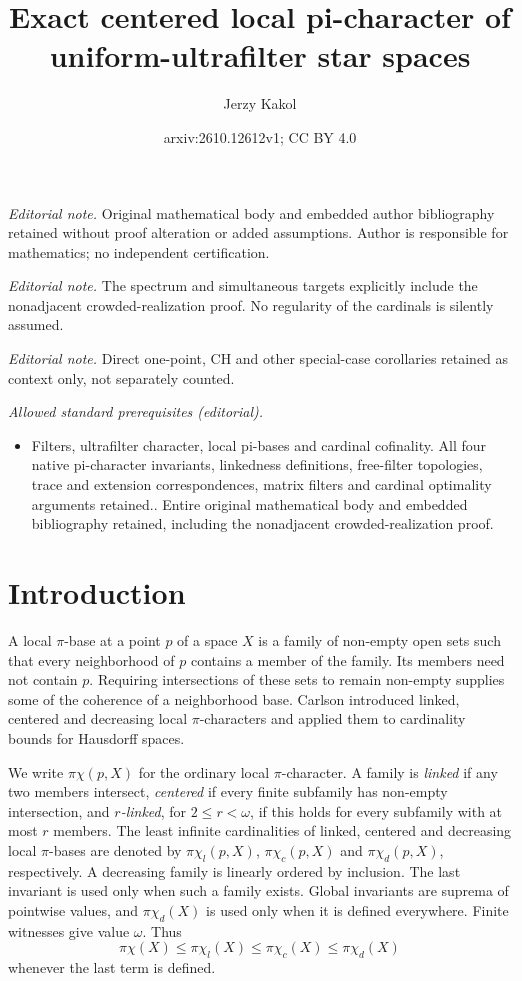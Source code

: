 \documentclass[10pt,a4paper]{amsart}
\title{Exact centered local pi-character of uniform-ultrafilter star spaces}
\author{Jerzy Kakol}
\date{arxiv:2610.12612v1; CC BY 4.0}
\theoremstyle{definition}
\theoremstyle{remark}
\newcommand{\pc}{\pi\chi}
\newcommand{\pcl}{\pi\chi_l}
\newcommand{\pcc}{\pi\chi_c}
\newcommand{\pcd}{\pi\chi_d}
\begin{document}
\maketitle
\noindent\textit{Editorial note.} Original mathematical body and embedded author bibliography retained without proof alteration or added assumptions. Author is responsible for mathematics; no independent certification.\par\medskip
\noindent\textit{Editorial note.} The spectrum and simultaneous targets explicitly include the nonadjacent crowded-realization proof. No regularity of the cardinals is silently assumed.\par\medskip
\noindent\textit{Editorial note.} Direct one-point, CH and other special-case corollaries retained as context only, not separately counted.\par\medskip
\noindent\textit{Allowed standard prerequisites (editorial).}\begin{itemize}
\item Filters, ultrafilter character, local pi-bases and cardinal cofinality. All four native pi-character invariants, linkedness definitions, free-filter topologies, trace and extension correspondences, matrix filters and cardinal optimality arguments retained.. Entire original mathematical body and embedded bibliography retained, including the nonadjacent crowded-realization proof.
\end{itemize}\medskip
\section{Introduction}

A local $\pi$-base at a point $p$ of a space $X$ is a family of non-empty open sets such that every neighborhood of $p$ contains a member of the family. Its members need not contain $p$. Requiring intersections of these sets to remain non-empty supplies some of the coherence of a neighborhood base. Carlson \cite{Carlson} introduced linked, centered and decreasing local $\pi$-characters and applied them to cardinality bounds for Hausdorff spaces.

We write $\pc(p,X)$ for the ordinary local $\pi$-character. A family is \emph{linked} if any two members intersect, \emph{centered} if every finite subfamily has non-empty intersection, and \emph{$r$-linked}, for $2\leqslant r<\omega$, if this holds for every subfamily with at most $r$ members. The least infinite cardinalities of linked, centered and decreasing local $\pi$-bases are denoted by $\pcl(p,X)$, $\pcc(p,X)$ and $\pcd(p,X)$, respectively. A decreasing family is linearly ordered by inclusion. The last invariant is used only when such a family exists. Global invariants are suprema of pointwise values, and $\pcd(X)$ is used only when it is defined everywhere. Finite witnesses give value $\omega$. Thus
\[
\pc(X)\leqslant\pcl(X)\leqslant\pcc(X)\leqslant\pcd(X)
\]
whenever the last term is defined.
\end{document}

